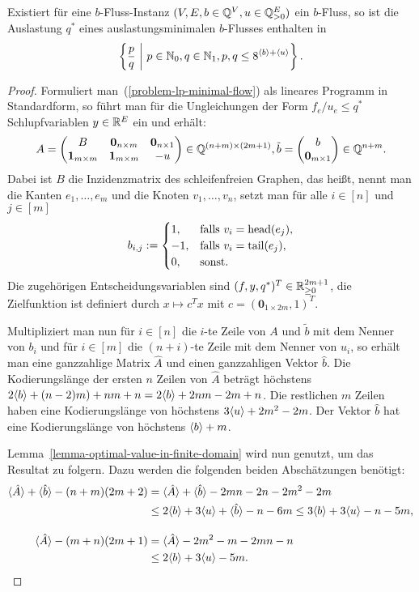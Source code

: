 \begin{corollary}\label{cor-minimal-congestion-limited}
	Existiert für eine $b$-Fluss-Instanz $(V, E, b\in\mathbb{Q}^V, u\in\mathbb{Q}^E_{>0})$ ein $b$-Fluss, so ist die Auslastung $q^*$ eines auslastungsminimalen $b$-Flusses enthalten in
	\[
	\left\{ \frac{p}{q} ~\middle|~ p\in\mathbb{N}_0, q\in\mathbb{N}_1, p,q \leq 8^{\langle b\rangle + \langle u\rangle } \right\}.
	\]
\end{corollary}
\begin{proof}
Formuliert man~(\ref{problem-lp-minimal-flow}) als lineares Programm in Standardform, so führt man für die Ungleichungen der Form $f_e/u_e \leq q^*$ Schlupfvariablen $y\in\mathbb{R}^E$ ein und erhält:
\newcommand{\nil}{\mathbf{0}}
\newcommand{\one}{\mathbf{1}}
\[
	A = \begin{pmatrix}
		B & \nil_{n\times m} & \nil_{n\times 1} \\
		\one_{m\times m} & \one_{m\times m} & -u
	\end{pmatrix} \in \Q^{(n+m) \times (2m+1)},
	\tilde{b} = \begin{pmatrix}
		b \\
		\nil_{m\times 1}
	\end{pmatrix} \in \Q^{n+m}.
\]
Dabei ist $B$ die Inzidenzmatrix des schleifenfreien Graphen, das heißt, nennt man die Kanten $e_1, \dots, e_m $ und die Knoten $v_1, \dots, v_n$, setzt man  für alle $i\in [n]$ und $j\in [m]$
\[ 
	b_{i,j} := \begin{cases}
		1, & \text{falls $v_i = \operatorname{head}(e_j)$}, \\
		-1, & \text{falls $v_i = \operatorname{tail}(e_j)$},\\
		0, & \text{sonst.}
	\end{cases}
\]
 Die zugehörigen Entscheidungsvariablen sind $(f, y, q^*)^T\in\mathbb{R}_{\geq 0}^{2m+1}$, die Zielfunktion ist definiert durch $x\mapsto c^T x$ mit $c = (\nil_{1\times 2m}, 1)^T$.
 
Multipliziert man nun für $i\in [n]$ die $i$-te Zeile von $A$ und $\tilde{b}$ mit dem Nenner von $b_i$ und für $i\in [m]$ die $(n+i)$-te Zeile mit dem Nenner von $u_i$, so erhält man eine ganzzahlige Matrix $\hat{A}$ und einen ganzzahligen Vektor $\hat{b}$.
Die Kodierungslänge der ersten $n$ Zeilen von $\hat{A}$ beträgt höchstens $2\langle b\rangle + (n-2)m) + nm + n = 2\langle b\rangle + 2nm -2m + n$.
Die restlichen $m$ Zeilen haben eine Kodierungslänge von höchstens $3\langle u\rangle + 2m^2 - 2m$.
Der Vektor $\hat{b}$ hat eine Kodierungslänge von höchstens $\langle b\rangle + m$.

Lemma~\ref{lemma-optimal-value-in-finite-domain} wird nun genutzt, um das Resultat zu folgern.
Dazu werden die folgenden beiden Abschätzungen benötigt:
\begin{align*}
\langle\hat{A}\rangle + \langle\hat{b}\rangle - (n+m)(2m+2) &= \langle\hat{A}\rangle + \langle\hat{b}\rangle - 2mn - 2n - 2m^2 - 2m\\
&\leq 2 \langle b\rangle + 3\langle u\rangle + \langle\hat{b}\rangle - n - 6m \leq 3\langle b\rangle + 3\langle u\rangle -n-5m, \\[1em]
\langle\hat{A}\rangle - (m+n)(2m + 1) &= \langle\hat{A}\rangle - 2m^2 - m - 2mn - n\\
&\leq 2\langle b\rangle + 3\langle u\rangle - 5m.
\end{align*}
\end{proof}

